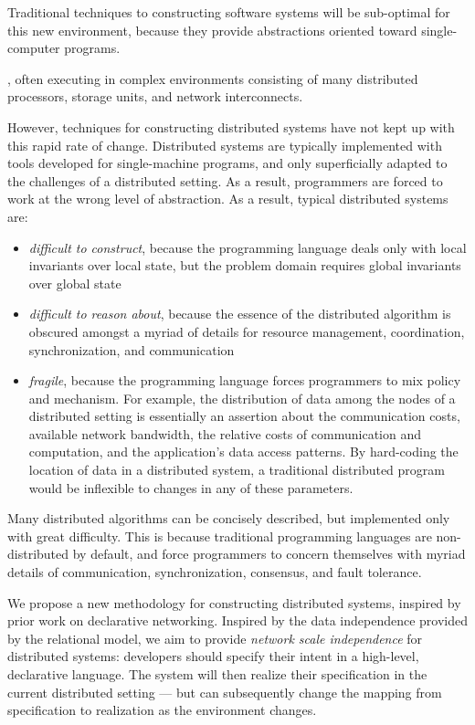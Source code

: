 \documentclass{article}
\begin{document}
Traditional techniques to constructing software systems will be
sub-optimal for this new environment, because they provide
abstractions oriented toward single-computer programs. 

,
often executing in complex environments consisting of many distributed
processors, storage units, and network interconnects.

However, techniques for constructing distributed systems have not kept
up with this rapid rate of change. Distributed systems are typically
implemented with tools developed for single-machine programs, and only
superficially adapted to the challenges of a distributed setting. As a
result, programmers are forced to work at the wrong level of
abstraction. As a result, typical distributed systems are:
\begin{itemize}
\item \emph{difficult to construct}, because the programming language
  deals only with local invariants over local state, but the problem
  domain requires global invariants over global state

\item \emph{difficult to reason about}, because the essence of the
  distributed algorithm is obscured amongst a myriad of details for
  resource management, coordination, synchronization, and
  communication

\item
  \emph{fragile}, because the programming language forces programmers
  to mix policy and mechanism. For example, the distribution of data
  among the nodes of a distributed setting is essentially an assertion
  about the communication costs, available network bandwidth, the
  relative costs of communication and computation, and the
  application's data access patterns. By hard-coding the location of
  data in a distributed system, a traditional distributed program
  would be inflexible to changes in any of these parameters.
\end{itemize}

Many distributed algorithms can be concisely described,
but implemented only with great difficulty. This is because
traditional programming languages are non-distributed by default, and
force programmers to concern themselves with myriad details of
communication, synchronization, consensus, and fault tolerance.

We propose a new methodology for constructing distributed systems,
inspired by prior work on declarative networking. Inspired by the data
independence provided by the relational model, we aim to provide
\emph{network scale independence} for distributed systems: developers
should specify their intent in a high-level, declarative language. The
system will then realize their specification in the current
distributed setting --- but can subsequently change the mapping from
specification to realization as the environment changes.
\end{document}
